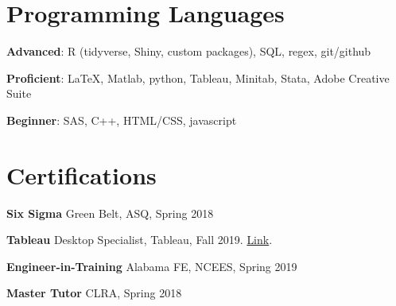 \documentclass[margin,line]{res}
\begin{document}
\begin{resume}
\vspace{.25cm}
\section{\sc Programming Languages} 
{\bf Advanced}:  R (tidyverse, Shiny, custom packages), SQL, regex, git/github
\vspace*{-3mm}

{\bf Proficient}:  \LaTeX, Matlab, python, Tableau, Minitab, Stata, Adobe Creative Suite
\vspace*{-3mm}

{\bf Beginner}:  SAS, C++, HTML/CSS, javascript
\vspace*{-3mm}


\vspace{.15cm}

\section{\sc Certifications}
{\bf Six Sigma} Green Belt, ASQ, Spring 2018
\vspace*{-3mm}

{\bf Tableau} Desktop Specialist, Tableau, Fall 2019. \href{https://www.credly.com/badges/e9a605a8-1977-4a1c-ab24-149a37c7fb36/linked_in_profile}{Link}.
\vspace*{-3mm}

{\bf Engineer-in-Training} Alabama FE, NCEES, Spring 2019
\vspace*{-3mm}

{\bf Master Tutor} CLRA, Spring 2018
\vspace*{-3mm}



\end{resume}
\end{document}
